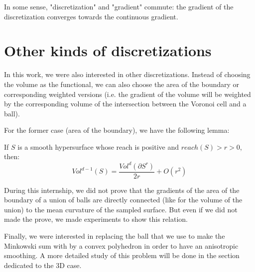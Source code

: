 In some sense, "discretization" and "gradient" commute: the gradient of the
discretization converges towards the continuous gradient.


\section{Other kinds of discretizations}


In this work, we were also interested in other discretizations. Instead of
choosing the volume as the functional, we can also choose the area of the
boundary or corresponding weighted versions (i.e. the gradient of the volume
will be weighted by the corresponding volume of the intersection between the
Voronoi cell and a ball).

For the former case (area of the boundary), we have the following lemma:
\begin{lemma}
    If $ S $ is a smooth hypersurface whose reach is positive and $ reach(S) > r
    > 0 $, then: $$ Vol^{d-1}(S) = \frac{Vol^d(\partial S^r)}{2r} + O(r^2) $$
\end{lemma}

During this internship, we did not prove that the gradients of the area of the
boundary of a union of balls are directly connected (like for the volume of the
union) to the mean curvature of the sampled surface. But even if we did not
made the prove, we made experiments to show this relation.

Finally, we were interested in replacing the ball that we use to make the
Minkowski sum with by a convex polyhedron in order to have an anisotropic
smoothing. A more detailed study of this problem will be done in the section
dedicated to the 3D case.

